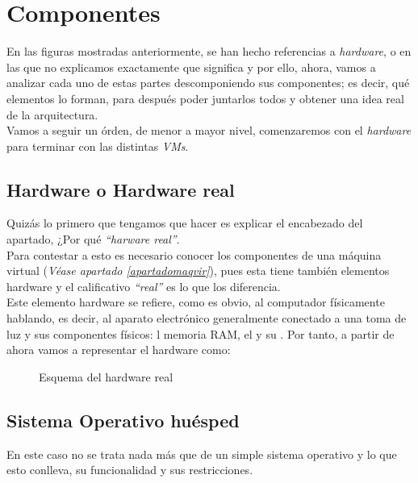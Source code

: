 \section{Componentes}
En las figuras mostradas anteriormente, se han hecho referencias a \emph{hardware}, \emph{} o \emph{} en las que no explicamos exactamente que significa y por ello, ahora, vamos a analizar cada uno de estas partes descomponiendo sus componentes; es decir, qué elementos lo forman, para después poder juntarlos todos y obtener una idea real de la arquitectura.\\

Vamos a seguir un órden, de menor a mayor nivel, comenzaremos con el \emph{hardware} para terminar con las distintas \emph{VMs}.

\subsection{Hardware o Hardware real}
Quizás lo primero que tengamos que hacer es explicar el encabezado del apartado, ¿Por qué \emph{\textquotedblleft harware real\textquotedblright}.\\
Para contestar a esto es necesario conocer los componentes de una máquina virtual (\textit{Véase apartado \ref{apartadomaqvir}}), pues esta tiene también elementos hardware y el calificativo \emph{\textquotedblleft real\textquotedblright} es lo que los diferencia.\\

Este elemento hardware se refiere, como es obvio, al computador físicamente hablando, es decir, al aparato electrónico generalmente conectado a una toma de luz y sus componentes físicos: l memoria RAM, el   y su . Por tanto, a partir de ahora vamos a representar el hardware como:

\begin{figure}[H]
\begin{center}
\end{center}
\caption[Hardware Real]{Esquema del hardware real}
\end{figure}

\subsection{Sistema Operativo huésped}\label{sohost}
En este caso no se trata nada más que de un simple sistema operativo y lo que esto conlleva, su funcionalidad y sus restricciones.\\

